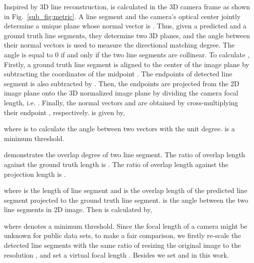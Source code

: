 \documentclass[runningheads]{llncs}
\begin{document}
Inspired by 3D line reconstruction,  is calculated in the 3D camera frame as shown in Fig.~\ref{sub_fig:metric}. A line segment and the camera's optical center jointly determine a unique plane whose normal vector is .
Thus, given a predicted and a ground truth line segments, they determine two 3D planes, and the angle between their normal vectors is used to measure the directional matching degree. The angle is equal to 0 if and only if the two line segments are collinear. To calculate , Firstly, a ground truth line segment is aligned to the center of the image plane by subtracting the coordinates of the midpoint . The endpoints of detected line segment is also subtracted by . Then, the endpoints are projected from the 2D image plane  onto the 3D normalized image plane by dividing the camera focal length, i.e. . Finally, the normal vectors  and  are obtained by cross-multiplying their endpoint , respectively.  is given by,

where  is to calculate the angle between two vectors with the unit degree.  is a minimum threshold.

 demonstrates the overlap degree of two line segment. The ratio of overlap length against the ground truth length is . The ratio of overlap length against the projection length is .

where  is the length of line segment and  is the overlap length of the predicted line segment projected to the ground truth line segment.  is the angle between the two line segments in 2D image. Then  is calculated by,

where  denotes a minimum threshold. Since the focal length of a camera might be unknown for public data sets, to make a fair comparison, we firstly re-scale the detected line segments with the same ratio of resizing the original image to the resolution , and set a virtual focal length . Besides we set  and  in this work.
\end{document}
